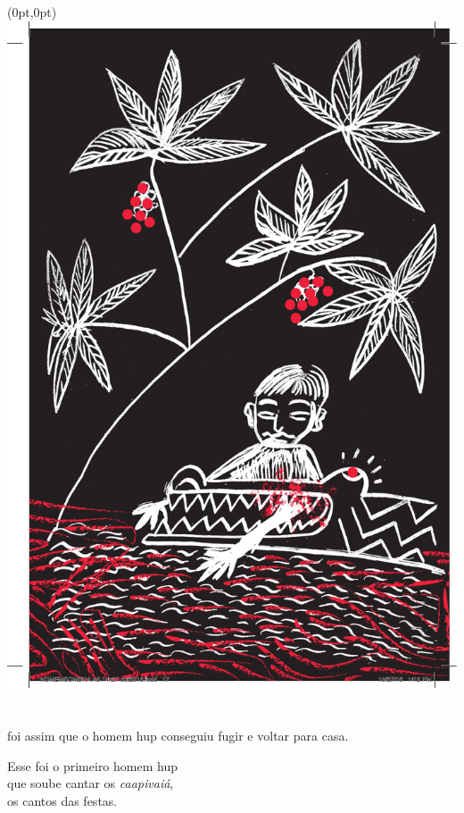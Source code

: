 \begin{textblock*}{8in}(0pt,0pt)%
\vspace*{-2.8cm}
\hspace*{-3.2cm}\includegraphics[width=153mm]{./imgs/img7.pdf}
\end{textblock*}

\chapter*{}

\mbox{}\vspace*{\fill}

 foi assim que
o homem hup
conseguiu fugir e
voltar para casa.

\medskip

Esse foi o primeiro homem hup\\
que soube cantar os \textit{caapivaiá},\\
os cantos das festas.

